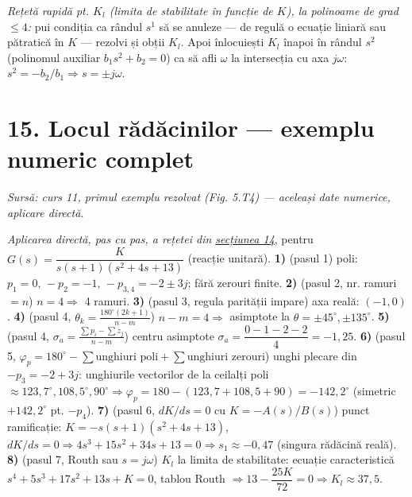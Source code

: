 \documentclass[10pt,a4paper]{article}
\newcommand{\srcnote}[1]{{\footnotesize\color{gray!55!black}\textit{Sursă: #1}}\par}
\newcommand{\tip}[1]{\textcolor{blue!55!black}{#1}}
\begin{document}
\tip{\textit{Rețetă rapidă pt. $K_l$ (limita de stabilitate în funcție de $K$), la polinoame de grad $\le4$:} pui condiția ca rândul $s^1$ să se anuleze — de regulă o ecuație liniară sau pătratică în $K$ — rezolvi și obții $K_l$. Apoi înlocuiești $K_l$ înapoi în rândul $s^2$ (polinomul auxiliar $b_1s^2{+}b_2{=}0$) ca să afli $\omega$ la intersecția cu axa $j\omega$: $s^2{=}-b_2/b_1\Rightarrow s{=}\pm j\omega$.}

\section*{15. Locul rădăcinilor — exemplu numeric complet}\label{sec:15}
\srcnote{curs 11, primul exemplu rezolvat (Fig. 5.T4) — aceleași date numerice, aplicare directă.}
\textit{Aplicarea directă, pas cu pas, a rețetei din \hyperref[sec:14]{secțiunea 14}}, pentru $G(s)=\dfrac{K}{s(s+1)(s^2+4s+13)}$ (reacție unitară). \textbf{1)} (pasul 1) poli: $p_1{=}0,\,{-}p_2{=}{-}1,\,{-}p_{3,4}{=}{-}2{\pm}3j$; fără zerouri finite. \textbf{2)} (pasul 2, nr. ramuri$=n$) $n{=}4\Rightarrow$ 4 ramuri. \textbf{3)} (pasul 3, regula parității impare) axa reală: $(-1,0)$. \textbf{4)} (pasul 4, $\theta_k{=}\tfrac{180^\circ(2k+1)}{n-m}$) $n{-}m{=}4\Rightarrow$ asimptote la $\theta=\pm45^\circ,\pm135^\circ$. \textbf{5)} (pasul 4, $\sigma_a{=}\tfrac{\sum p_i-\sum z_j}{n-m}$) centru asimptote $\sigma_a=\dfrac{0-1-2-2}{4}=-1{,}25$. \textbf{6)} (pasul 5, $\varphi_p{=}180^\circ{-}\sum\text{unghiuri poli}{+}\sum\text{unghiuri zerouri}$) unghi plecare din $-p_3{=}-2{+}3j$: unghiurile vectorilor de la ceilalți poli $\approx123{,}7^\circ,108{,}5^\circ,90^\circ\Rightarrow \varphi_p=180-(123{,}7+108{,}5+90)=-142{,}2^\circ$ (simetric $+142{,}2^\circ$ pt. $-p_4$). \textbf{7)} (pasul 6, $dK/ds{=}0$ cu $K{=}{-}A(s)/B(s)$) punct ramificație: $K=-s(s+1)(s^2+4s+13)$, $dK/ds=0\Rightarrow4s^3+15s^2+34s+13=0\Rightarrow s_1\approx-0{,}47$ (singura rădăcină reală). \textbf{8)} (pasul 7, Routh sau $s{=}j\omega$) $K_l$ la limita de stabilitate: ecuație caracteristică $s^4+5s^3+17s^2+13s+K=0$, tablou Routh $\Rightarrow 13-\dfrac{25K}{72}=0\Rightarrow K_l\approx37{,}5$.
\end{document}
